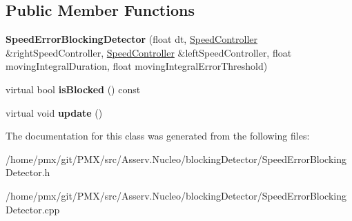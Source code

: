 \subsection*{Public Member Functions}
\begin{DoxyCompactItemize}
\item 
\mbox{\label{classSpeedErrorBlockingDetector_a0ca4824c8c2660b5efef55e7c322bab1}} 
{\bfseries Speed\+Error\+Blocking\+Detector} (float dt, \hyperlink{classSpeedController}{Speed\+Controller} \&right\+Speed\+Controller, \hyperlink{classSpeedController}{Speed\+Controller} \&left\+Speed\+Controller, float moving\+Integral\+Duration, float moving\+Integral\+Error\+Threshold)
\item 
\mbox{\label{classSpeedErrorBlockingDetector_ab7ac7a600c256b59cd237b67600dcc11}} 
virtual bool {\bfseries is\+Blocked} () const
\item 
\mbox{\label{classSpeedErrorBlockingDetector_a965878e4f585cf215fc6dcf5c35cff0b}} 
virtual void {\bfseries update} ()
\end{DoxyCompactItemize}


The documentation for this class was generated from the following files\+:\begin{DoxyCompactItemize}
\item 
/home/pmx/git/\+P\+M\+X/src/\+Asserv.\+Nucleo/blocking\+Detector/Speed\+Error\+Blocking\+Detector.\+h\item 
/home/pmx/git/\+P\+M\+X/src/\+Asserv.\+Nucleo/blocking\+Detector/Speed\+Error\+Blocking\+Detector.\+cpp\end{DoxyCompactItemize}
